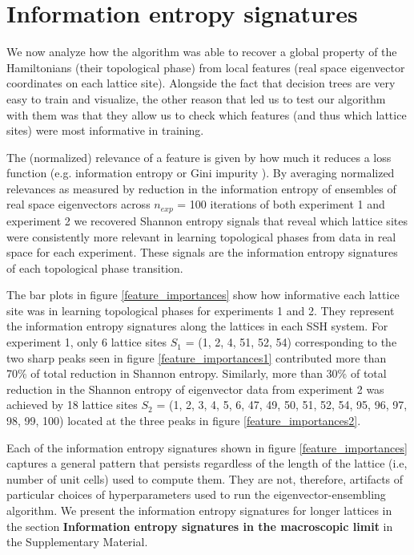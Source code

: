 \documentclass[fleqn,10pt]{wlscirep}
\begin{document}
\section*{Information entropy signatures}

We now analyze how the algorithm was able to recover a global property of the Hamiltonians (their topological phase) from local features (real space eigenvector coordinates on each lattice site). Alongside the fact that decision trees are very easy to train and visualize, the other reason that led us to test our algorithm with them was that they allow us to check which features (and thus which lattice sites) were most informative in training.

The (normalized) relevance of a feature is given by how much it reduces a loss function (e.g. information entropy or Gini impurity \cite{friedman2001elements}). By averaging normalized relevances as measured by reduction in the information entropy of ensembles of real space eigenvectors across $n_{exp}$ = 100 iterations of both experiment 1 and experiment 2 we recovered Shannon entropy signals that reveal which lattice sites were consistently more relevant in learning topological phases from data in real space for each experiment. These signals are the information entropy signatures of each topological phase transition. 

The bar plots in figure \ref{feature_importances} show how informative each lattice site was in learning topological phases for experiments 1 and 2. They represent the information entropy signatures along the lattices in each SSH system. For experiment 1, only 6 lattice sites $S_1$ = (1, 2, 4, 51, 52, 54) corresponding to the two sharp peaks seen in figure \ref{feature_importances1} contributed more than 70\% of total reduction in Shannon entropy. Similarly, more than 30\% of total reduction in the Shannon entropy of eigenvector data from experiment 2 was achieved by 18 lattice sites $S_2$ = (1, 2, 3, 4, 5, 6, 47, 49, 50, 51, 52, 54, 95, 96, 97, 98, 99, 100) located at the three peaks in figure \ref{feature_importances2}.

Each of the information entropy signatures shown in figure \ref{feature_importances} captures a general pattern that persists regardless of the length of the lattice (i.e, number of unit cells) used to compute them. They are not, therefore, artifacts of particular choices of hyperparameters used to run the eigenvector-ensembling algorithm. We present the information entropy signatures for longer lattices in the section \textbf{Information entropy signatures in the macroscopic limit} in the Supplementary Material.
\end{document}
